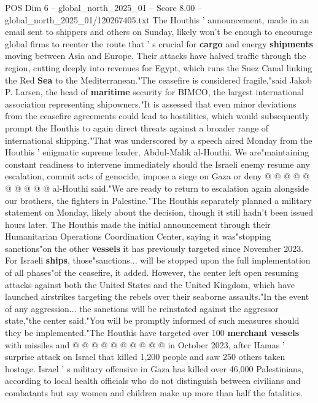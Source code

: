 \begin{textsample}{POS Dim 6 – global\_north\_2025\_01 – Score 8.00 – global\_north\_2025\_01/120267405.txt}  \label{ex:f6_pos_272}
The Houthis ' announcement, made in an email sent to shippers and others on Sunday, likely won't be enough to encourage global firms to reenter the route that ' s crucial for \textbf{cargo} and energy \textbf{shipments} moving between Asia and Europe.
Their attacks have halved traffic through the region, cutting deeply into revenues for Egypt, which runs the Suez Canal linking the Red \textbf{Sea} to the Mediterranean."The ceasefire is considered fragile,"said Jakob P.
Larsen, the head of \textbf{maritime} security for BIMCO, the largest international association representing shipowners."It is assessed that even minor deviations from the ceasefire agreements could lead to hostilities, which would subsequently prompt the Houthis to again direct threats against a broader range of international shipping."That was underscored by a speech aired Monday from the Houthis ' enigmatic supreme leader, Abdul-Malik al-Houthi.
We are"maintaining constant readiness to intervene immediately should the Israeli enemy resume any escalation, commit acts of genocide, impose a siege on Gaza or deny @ @ @ @ @ @ @ @ @ @ al-Houthi said."We are ready to return to escalation again alongside our brothers, the fighters in Palestine."The Houthis separately planned a military statement on Monday, likely about the decision, though it still hadn't been issued hours later.
The Houthis made the initial announcement through their Humanitarian Operations Coordination Center, saying it was"stopping sanctions"on the other \textbf{vessels} it has previously targeted since November 2023.
For Israeli \textbf{ships}, those"sanctions... will be stopped upon the full implementation of all phases"of the ceasefire, it added.
However, the center left open resuming attacks against both the United States and the United Kingdom, which have launched airstrikes targeting the rebels over their seaborne assaults."In the event of any aggression... the sanctions will be reinstated against the aggressor state,"the center said."You will be promptly informed of such measures should they be implemented."The Houthis have targeted over 100 \textbf{merchant} \textbf{vessels} with missiles and @ @ @ @ @ @ @ @ @ @ in October 2023, after Hamas ' surprise attack on Israel that killed 1,200 people and saw 250 others taken hostage.
Israel ' s military offensive in Gaza has killed over 46,000 Palestinians, according to local health officials who do not distinguish between civilians and combatants but say women and children make up more than half the fatalities.

\end{textsample}
